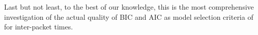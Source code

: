 Last but not least, to the best of our knowledge, this is the most comprehensive investigation of the actual quality of BIC and AIC as model selection criteria of for inter-packet times.























